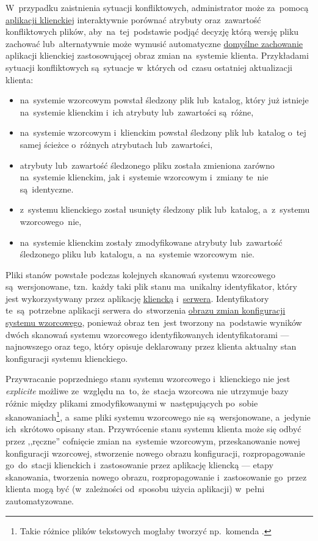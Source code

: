 \documentclass[thesis]{subfiles}
\begin{document}
W~przypadku zaistnienia sytuacji konfliktowych, administrator może za~pomocą \hyperref[sec:cli-app]{aplikacji klienckiej} interaktywnie porównać atrybuty oraz~zawartość konfliktowych plików, aby~na~tej~podstawie podjąć decyzję którą wersję pliku zachować lub~alternatywnie może wymusić automatyczne \hyperlink{itm:cli-force}{domyślne zachowanie} aplikacji klienckiej zastosowującej obraz zmian na~systemie klienta. Przykładami sytuacji konfliktowych są~sytuacje w~których od~czasu ostatniej aktualizacji klienta:\mynobreakpar
\begin{itemize}
	\item na~systemie wzorcowym powstał śledzony plik lub~katalog, który już istnieje na~systemie klienckim i~ich atrybuty lub~zawartości są~różne,
	\item na~systemie wzorcowym i~klienckim powstał śledzony plik lub~katalog o~tej samej ścieżce o~różnych atrybutach lub~zawartości,
	\item atrybuty lub~zawartość śledzonego pliku została zmieniona zarówno na~systemie klienckim, jak i~systemie wzorcowym i~zmiany te~nie są~identyczne.
	\item z~systemu klienckiego został usunięty śledzony plik lub~katalog, a~z~systemu wzorcowego~nie,
	\item na~systemie klienckim zostały zmodyfikowane atrybuty lub~zawartość śledzonego pliku lub~katalogu, a~na~systemie wzorcowym~nie.
\end{itemize}

Pliki stanów powstałe podczas kolejnych skanowań systemu wzorcowego są~wersjonowane, tzn.~każdy taki plik stanu ma~unikalny identyfikator, który jest wykorzystywany przez aplikację \hyperref[sec:cli-app]{kliencką} i~\hyperref[sec:srv-app]{serwera}. Identyfikatory te~są~potrzebne aplikacji serwera do~stworzenia \hyperref[sec:obraz-zmian-konfiguracji]{obrazu zmian konfiguracji systemu wzorcowego}, ponieważ obraz ten~jest tworzony na~podstawie wyników dwóch skanowań systemu wzorcowego identyfikowanych identyfikatorami --- najnowszego oraz tego, który opisuje deklarowany przez klienta aktualny stan konfiguracji systemu klienckiego.

Przywracanie poprzedniego stanu systemu wzorcowego i~klienckiego nie jest \emph{explicite} możliwe ze~względu na~to, że~stacja wzorcowa nie utrzymuje bazy różnic między plikami zmodyfikowanymi w~następujących po~sobie skanowaniach\footnote{Takie różnice plików tekstowych mogłaby tworzyć np.~komenda .}, a~same pliki systemu wzorcowego nie są~wersjonowane, a~jedynie ich~skrótowo opisany stan. Przywrócenie stanu systemu klienta może się odbyć przez ,,ręczne'' cofnięcie zmian na~systemie wzorcowym, przeskanowanie nowej konfiguracji wzorcowej, stworzenie nowego obrazu konfiguracji, rozpropagowanie go~do~stacji klienckich i~zastosowanie przez aplikację kliencką --- etapy skanowania, tworzenia nowego obrazu, rozpropagowanie i~zastosowanie go~przez klienta mogą być (w~zależności od~sposobu użycia aplikacji) w~pełni zautomatyzowane.
\end{document}
